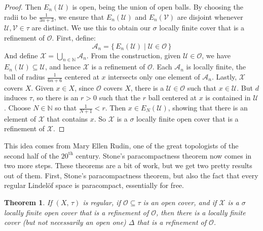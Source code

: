 \documentclass{article}
\theoremstyle{plain}
\newtheorem{theorem}{Theorem}[section]
\theoremstyle{normal}
\begin{document}
\begin{proof}
            Then $E_{n}(\mathcal{U})$ is open, being the union of open balls.
            By choosing the radii to be $\frac{1}{3n+3}$, we ensure that
            $E_{n}(\mathcal{U})$ and $E_{n}(\mathcal{V})$ are disjoint
            whenever $\mathcal{U},\mathcal{V}\in\tau$ are distinct. We use
            this to obtain our $\sigma$ locally finite cover that is a
            refinement of $\mathcal{O}$. First, define:
            \begin{equation}
                \mathcal{A}_{n}=
                \{\,E_{n}(\mathcal{U})\;|\;\mathcal{U}\in\mathcal{O}\,\}
            \end{equation}
            And define $\mathcal{X}=\bigcup_{n\in\mathbb{N}}\mathcal{A}_{n}$.
            From the construction, given $\mathcal{U}\in\mathcal{O}$, we have
            $E_{n}(\mathcal{U})\subseteq\mathcal{U}$, and hence
            $\mathcal{X}$ is a refinement of $\mathcal{O}$. Each
            $\mathcal{A}_{n}$ is locally finite, the ball of radius
            $\frac{1}{6n+6}$ centered at $x$ intersects only one element of
            $\mathcal{A}_{n}$. Lastly, $\mathcal{X}$ covers $X$. Given
            $x\in{X}$, since $\mathcal{O}$ covers $X$, there is a
            $\mathcal{U}\in\mathcal{O}$ such that $x\in\mathcal{U}$. But
            $d$ induces $\tau$, so there is an $r>0$ such that
            the $r$ ball centered at $x$ is contained in $\mathcal{U}$. Choose
            $N\in\mathbb{N}$ so that $\frac{1}{N+1}<r$. Then
            $x\in{E}_{N}(\mathcal{U})$, showing that there is an element of
            $\mathcal{X}$ that contains $x$. So $\mathcal{X}$ is a
            $\sigma$ locally finite open cover that is a refinement of
            $\mathcal{X}$.
        \end{proof}
        This idea comes from Mary Ellen Rudin, one of the great topologists of
        the second half of the $20^{\textrm{th}}$ century. Stone's
        paracompactness theorem now comes in two more steps. These
        theorems are a bit of work, but we get two pretty results out of
        them. First, Stone's paracompactness theorem, but also the fact that
        every regular Lindel\"{o}f space is paracompact, essentially for free.
        \begin{theorem}
            If $(X,\,\tau)$ is regular, if $\mathcal{O}\subseteq\tau$ is an
            open cover, and if $\mathcal{X}$ is a $\sigma$ locally finite open
            cover that is a refinement of $\mathcal{O}$, then there is a
            locally finite cover (but not necessarily an open one)
            $\Delta$ that is a refinement of $\mathcal{O}$.
        \end{theorem}
\end{document}
